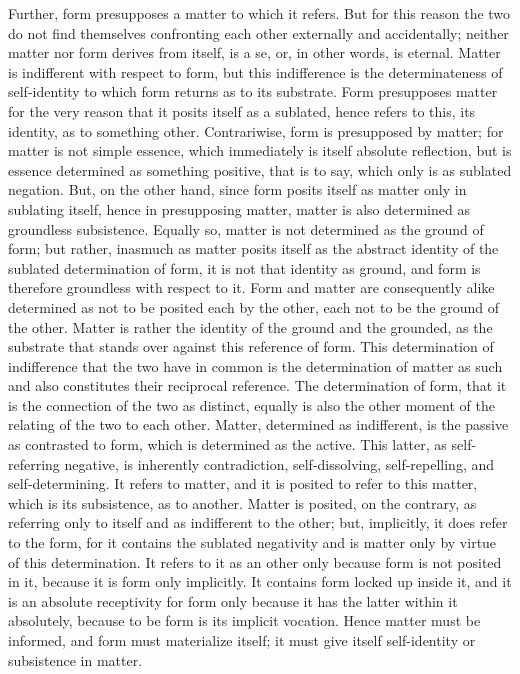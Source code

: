 Further, form presupposes a matter to which it refers.
But for this reason the two do not find themselves
confronting each other externally and accidentally;
neither matter nor form derives from itself, is a se,
or, in other words, is eternal.
Matter is indifferent with respect to form,
but this indifference is the determinateness
of self-identity to which
form returns as to its substrate.
Form presupposes matter for the very reason
that it posits itself as a sublated,
hence refers to this, its identity,
as to something other.
Contrariwise, form is presupposed by matter;
for matter is not simple essence,
which immediately is itself absolute reflection,
but is essence determined as something positive,
that is to say, which only is as sublated negation.
But, on the other hand, since form posits itself as matter only in
sublating itself, hence in presupposing matter,
matter is also determined as groundless subsistence.
Equally so, matter is not determined as the ground of form;
but rather, inasmuch as matter posits itself as the abstract identity
of the sublated determination of form,
it is not that identity as ground,
and form is therefore groundless with respect to it.
Form and matter are consequently alike determined as
not to be posited each by the other,
each not to be the ground of the other.
Matter is rather the identity of
the ground and the grounded,
as the substrate that stands over
against this reference of form.
This determination of indifference that
the two have in common is
the determination of matter as such
and also constitutes their reciprocal reference.
The determination of form, that it is
the connection of the two as distinct,
equally is also the other moment of
the relating of the two to each other.
Matter, determined as indifferent,
is the passive as contrasted to form,
which is determined as the active.
This latter, as self-referring negative,
is inherently contradiction, self-dissolving,
self-repelling, and self-determining.
It refers to matter, and it is posited to refer to this matter,
which is its subsistence, as to another.
Matter is posited, on the contrary,
as referring only to itself
and as indifferent to the other;
but, implicitly, it does refer to the form,
for it contains the sublated negativity
and is matter only by virtue of this determination.
It refers to it as an other only
because form is not posited in it,
because it is form only implicitly.
It contains form locked up inside it,
and it is an absolute receptivity for form
only because it has the latter within it absolutely,
because to be form is its implicit vocation.
Hence matter must be informed,
and form must materialize itself;
it must give itself self-identity
or subsistence in matter.

